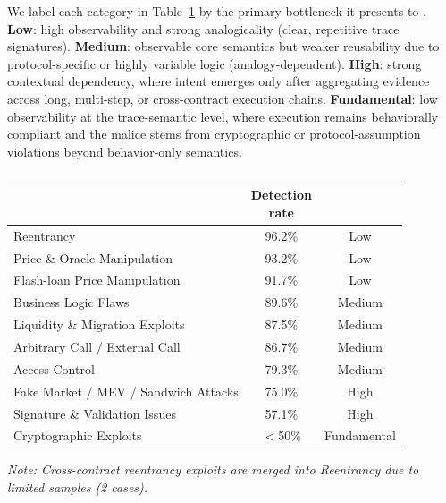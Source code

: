We label each category in Table~\ref{tab:capability_spectrum} by the primary bottleneck it presents to \approach{}. \textbf{Low}: high observability and strong analogicality (clear, repetitive trace signatures). \textbf{Medium}: observable core semantics but weaker reusability due to protocol-specific or highly variable logic (analogy-dependent). \textbf{High}: strong contextual dependency, where intent emerges only after aggregating evidence across long, multi-step, or cross-contract execution chains. \textbf{Fundamental}: low observability at the trace-semantic level, where execution remains behaviorally compliant and the malice stems from cryptographic or protocol-assumption violations beyond behavior-only semantics.


\begin{table}[t]
	\centering
	\caption{}
	\label{tab:capability_spectrum}
	\small
\setlength{\tabcolsep}{3pt}
	\begin{tabular}{@{}>{\raggedright\arraybackslash}p{}cc@{}}
		\toprule
		\text{Type} & \makecell{Detection\\rate} & \text{Difficulty} \\
		\midrule
		Reentrancy & 96.2\% & Low \\
        Price \& Oracle Manipulation & 93.2\% & Low \\
		Flash-loan Price Manipulation & 91.7\% & Low \\
		Business Logic Flaws & 89.6\% & Medium \\
		Liquidity \& Migration Exploits & 87.5\% & Medium \\
		Arbitrary Call / External Call & 86.7\% & Medium \\
		Access Control & 79.3\% & Medium \\
		Fake Market / MEV / Sandwich Attacks & 75.0\% & High \\
		Signature \& Validation Issues & 57.1\% & High \\
		Cryptographic Exploits  & $<$50\% & Fundamental \\
		\bottomrule
	\end{tabular}
	
	\smallskip\scriptsize\textit{Note: Cross-contract reentrancy exploits are merged into Reentrancy due to limited samples (2 cases).}
\end{table}


